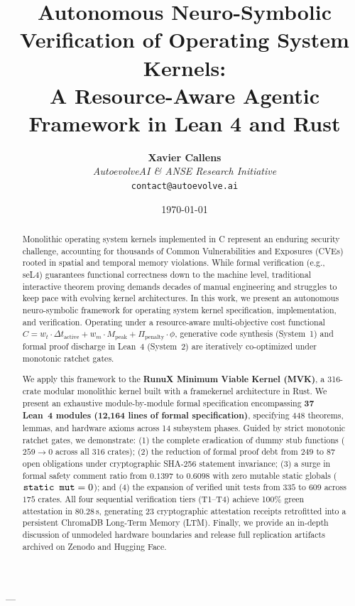 \documentclass[10pt,twocolumn,letterpaper]{article}
\title{\textbf{Autonomous Neuro-Symbolic Verification of Operating System Kernels:\\A Resource-Aware Agentic Framework in Lean 4 and Rust}}
\author{
  \textbf{Xavier Callens}\\
  \textit{AutoevolveAI \& ANSE Research Initiative}\\
  \texttt{contact@autoevolve.ai}
}
\date{\today}
\theoremstyle{definition}
\begin{document}
\maketitle

\begin{abstract}
Monolithic operating system kernels implemented in C represent an enduring security challenge, accounting for thousands of Common Vulnerabilities and Exposures (CVEs) rooted in spatial and temporal memory violations. While formal verification (e.g., seL4) guarantees functional correctness down to the machine level, traditional interactive theorem proving demands decades of manual engineering and struggles to keep pace with evolving kernel architectures. In this work, we present an autonomous neuro-symbolic framework for operating system kernel specification, implementation, and verification. Operating under a resource-aware multi-objective cost functional $C = w_t \cdot \Delta t_{\text{active}} + w_m \cdot M_{\text{peak}} + \Pi_{\text{penalty}} \cdot \phi$, generative code synthesis (System~1) and formal proof discharge in Lean~4 (System~2) are iteratively co-optimized under monotonic ratchet gates.

We apply this framework to the \textbf{RunuX Minimum Viable Kernel (MVK)}, a 316-crate modular monolithic kernel built with a framekernel architecture in Rust. We present an exhaustive module-by-module formal specification encompassing \textbf{37 Lean~4 modules (12,164 lines of formal specification)}, specifying 448 theorems, lemmas, and hardware axioms across 14 subsystem phases. Guided by strict monotonic ratchet gates, we demonstrate: (1) the complete eradication of dummy stub functions ($259 \to 0$ across all 316 crates); (2) the reduction of formal proof debt from $249$ to $87$ open obligations under cryptographic SHA-256 statement invariance; (3) a surge in formal safety comment ratio from $0.1397$ to $0.6098$ with zero mutable static globals ($\text{\texttt{static mut}} = 0$); and (4) the expansion of verified unit tests from $335$ to $609$ across $175$ crates. All four sequential verification tiers (T1--T4) achieve 100\% green attestation in $80.28\,$s, generating 23 cryptographic attestation receipts retrofitted into a persistent ChromaDB Long-Term Memory (LTM). Finally, we provide an in-depth discussion of unmodeled hardware boundaries and release full replication artifacts archived on Zenodo and Hugging Face.
\end{abstract}

---
\end{document}
